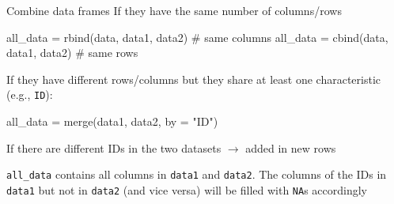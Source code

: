 \documentclass[
  ignorenonframetext,
]{beamer}
\newenvironment{Shaded}{\begin{snugshade}}{\end{snugshade}}
\newcommand{\AttributeTok}[1]{\textcolor[rgb]{0.00,0.34,0.68}{#1}}
\newcommand{\CommentTok}[1]{\textcolor[rgb]{0.54,0.53,0.53}{#1}}
\newcommand{\FunctionTok}[1]{\textcolor[rgb]{0.39,0.29,0.61}{#1}}
\newcommand{\NormalTok}[1]{\textcolor[rgb]{0.12,0.11,0.11}{#1}}
\newcommand{\OtherTok}[1]{\textcolor[rgb]{0.00,0.43,0.16}{#1}}
\newcommand{\StringTok}[1]{\textcolor[rgb]{0.75,0.01,0.01}{#1}}
\begin{document}
\begin{frame}[fragile]{Combine data frames}
\protect\hypertarget{combine-data-frames}{}
If they have the same number of columns/rows

\begin{Shaded}
\begin{Highlighting}[]
\NormalTok{all\_data }\OtherTok{=} \FunctionTok{rbind}\NormalTok{(data, data1, data2) }\CommentTok{\# same columns}
\NormalTok{all\_data }\OtherTok{=} \FunctionTok{cbind}\NormalTok{(data, data1, data2) }\CommentTok{\# same rows}
\end{Highlighting}
\end{Shaded}

If they have different rows/columns but they share at least one
characteristic (e.g., \texttt{ID}):

\begin{Shaded}
\begin{Highlighting}[]
\NormalTok{all\_data }\OtherTok{=} \FunctionTok{merge}\NormalTok{(data1, data2, }
                 \AttributeTok{by =} \StringTok{"ID"}\NormalTok{)}
\end{Highlighting}
\end{Shaded}

If there are different IDs in the two datasets \(\rightarrow\) added in
new rows

\texttt{all\_data} contains all columns in \texttt{data1} and
\texttt{data2}. The columns of the IDs in \texttt{data1} but not in
\texttt{data2} (and vice versa) will be filled with \texttt{NA}s
accordingly
\end{frame}
\end{document}
